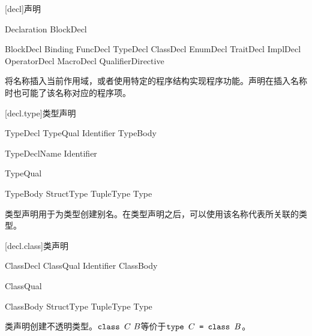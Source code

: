 
[decl]{声明}

\begin{bnf}{Declaration}
    BlockDecl
\end{bnf}

\begin{bnf}{BlockDecl}
    Binding \br
    FuncDecl \br
    TypeDecl \br
    ClassDecl \br
    EnumDecl \br
    TraitDecl \br
    ImplDecl \br
    OperatorDecl \br
    MacroDecl \br
    QualifierDirective
\end{bnf}

\pnum
{}将名称插入当前作用域，或者使用特定的程序结构实现程序功能。声明在插入名称时也可能了该名称对应的程序项。

[decl.type]{类型声明}

\begin{bnf}{TypeDecl}
    TypeQual\bnfs {} Identifier TypeBody
\end{bnf}

\begin{bnf}{TypeDeclName}
    Identifier \br
\end{bnf}

\begin{bnf}{TypeQual}
\end{bnf}

\begin{bnf}{TypeBody}
    StructType \br
    TupleType \br
    \terminal{=} Type
\end{bnf}

\pnum
类型声明用于为类型创建别名。在类型声明之后，可以使用该名称代表所关联的类型。

[decl.class]{类声明}

\begin{bnf}{ClassDecl}
    ClassQual\bnfs {} Identifier ClassBody
\end{bnf}

\begin{bnf}{ClassQual}
\end{bnf}

\begin{bnf}{ClassBody}
    StructType \br
    TupleType \br
    \terminal{=} Type
\end{bnf}

\pnum
类声明创建不透明类型。$\tcode{class }C\ B$等价于$\texttt{type }C\texttt{ = class }B$。

